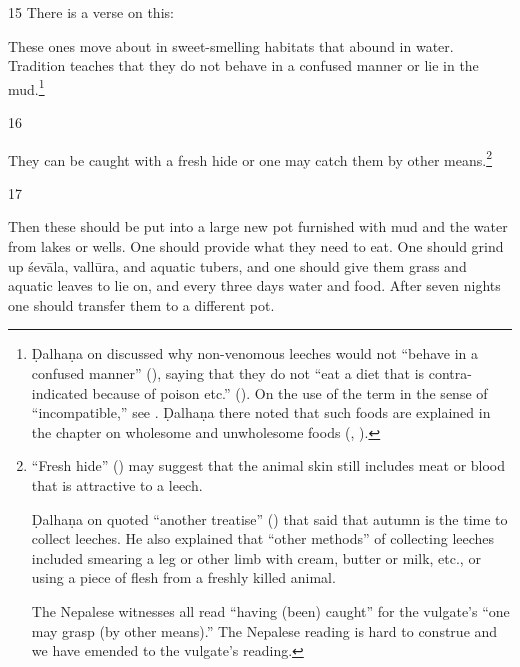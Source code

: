 \begin{translation}
\item[15]
There is a verse on this:

\begin{sloka}
    These ones move about in sweet-smelling habitats that abound in water.
Tradition teaches that they do not behave in a confused manner or lie in the
mud.\footnote{Ḍalhaṇa on  discussed why non-venomous 
leeches
    would not “behave in a confused manner” (), saying that
    they do not “eat a diet that is contra-indicated because of poison etc.”
    ().  On the use of the term  in
    the sense of “incompatible,” see . Ḍalhaṇa there noted that
    such foods are explained in the chapter on wholesome and unwholesome 
    foods
    (, ).}
\end{sloka}

\item[16]

They can be caught with a fresh hide or one may catch them by other 
means.\footnote{“Fresh hide” () may suggest that the 
animal skin still 
includes
meat or blood that is attractive to a leech.

   Ḍalhaṇa on  quoted “another treatise”
() that said that autumn is the time to collect
leeches.  He also explained that “other methods” of collecting leeches
included smearing a leg or other limb with cream, butter or milk, etc.,
or using a piece of flesh from a freshly killed animal.

The Nepalese witnesses all read  “having (been)
caught” for the vulgate's  “one may grasp (by other means).” 
The Nepalese reading is hard to construe and we have emended to the 
vulgate's reading.}


\item [17] 

Then these should be put into a large new pot furnished with mud
and the water from lakes or wells. One should provide what they need to eat.
One should grind up \gls{śevāla}, \gls{vallūra}, and aquatic tubers, and one
should give them grass and aquatic leaves to lie on, and every three days
water and food.
%    
After seven nights one should transfer them to a different pot.


\end{translation}
